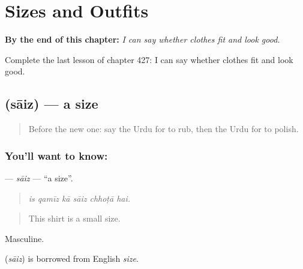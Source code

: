 
\chapter{Sizes and Outfits}
\label{ch:ur-sizes-and-outfits}

\begin{chapteropening}
\textbf{By the end of this chapter:} \emph{I can say whether clothes fit and look good.}

Complete the last lesson of chapter 427: I can say whether clothes fit and look good.
\end{chapteropening}

\section[\texorpdfstring{\ur{سائز} (sāiz)}{سائز (sāiz)}]{ (sāiz) — a size}

\label{lesson:UR-C427-saiz}



\begin{quote}
Before the new one: say the Urdu for to rub, then the Urdu for to polish.
\end{quote}

\subsection*{You'll want to know: }
\textbf{} — \emph{sāiz} — \textquotedblleft{}a size\textquotedblright{}.

\begin{quote}
     
\end{quote}

\begin{quote}
\emph{is qamīz kā sāiz chhoṭā hai.}
\end{quote}

\begin{quote}
This shirt is a small size.
\end{quote}

Masculine.

\begin{cousinweb}
\textbf{} (\emph{sāiz}) is borrowed from English \emph{size}.
\end{cousinweb}

